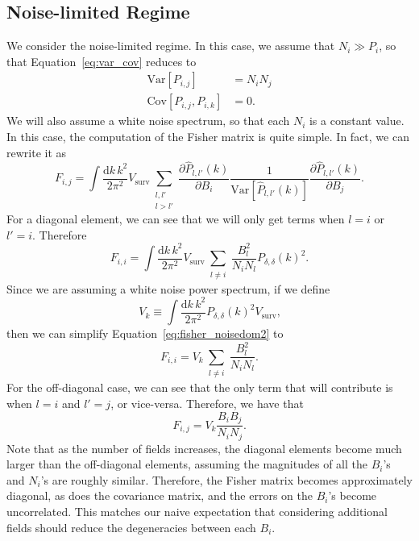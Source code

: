 \documentclass{aastex62}
\newcommand{\beq}{\begin{equation}}
\newcommand{\eeq}{\end{equation}}
\newcommand{\denps}{\ensuremath{P_{\delta,\delta}}}
\newcommand{\xps}[2]{\ensuremath{P_{#1,#2}}}
\newcommand{\Var}[1]{\mathrm{Var}[#1]}
\newcommand{\Cov}[2]{\mathrm{Cov}[#1,#2]}
\begin{document}
\subsection{Noise-limited Regime} \label{ssec:noise_limited}
We consider the noise-limited regime. In this case, we assume that $N_i \gg
P_i$, so that Equation~\ref{eq:var_cov} reduces to
\beq \label{eq:var_cov_noise}
\begin{split}
\Var{\xps{i}{j}} &= N_iN_j \\
\Cov{\xps{i}{j}}{\xps{i}{k}} &= 0 \text{.}
\end{split}
\eeq
We will also assume a white noise spectrum, so that each $N_i$ is a constant
value. In this case, the computation of the Fisher matrix is quite simple. In
fact, we can rewrite it as
\beq\label{eq:fisher_noisedom}
F_{i,j} = 
\int \frac{\text{d}k\,k^2}{2\pi^2} V_{\text{surv}} 
\sum_{\substack{l,l'\\l > l'}}
\frac{\partial \hat{P}_{l,l'}(k)}{\partial B_i}
\frac{1}{\Var{\hat{P}_{l,l'}(k)}}
\frac{\partial \hat{P}_{l,l'}(k)}{\partial B_j}\text{.}
\eeq
For a diagonal element, we can see that we will only get terms when $l=i$ or $l'=i$. Therefore
\beq\label{eq:fisher_noisedom2}
F_{i,i} = 
\int \frac{\text{d}k\,k^2}{2\pi^2} V_{\text{surv}} 
\sum_{\substack{l\neq i}}
\frac{B_l^2}{N_iN_l}\denps(k)^2\text{.}
\eeq
Since we are assuming a white noise power spectrum, if we define
\begin{equation*}
V_k \equiv \int \frac{\text{d}k\,k^2}{2\pi^2} \denps(k)^2 V_{\text{surv}}\text{,}
\end{equation*}
then we can simplify Equation~\ref{eq:fisher_noisedom2} to
\beq\label{eq:fisher_noisedom_diag}
F_{i,i} = 
V_k
\sum_{\substack{l\neq i}}
\frac{B_l^2}{N_iN_l}\text{.}
\eeq
For the off-diagonal case, we can see that the only term that will contribute
is when $l=i$ and $l'=j$, or vice-versa. Therefore, we have that
\beq\label{eq:fisher_noisedom_offdiag}
F_{i,j} = V_k
\frac{B_iB_j}{N_iN_j}\text{.}
\eeq
Note that as the number of fields increases, the diagonal elements become much
larger than the off-diagonal elements, assuming the magnitudes of all the
$B_i$'s and $N_i$'s are roughly similar. Therefore, the Fisher matrix becomes
approximately diagonal, as does the covariance matrix, and the errors on the
$B_i$'s become uncorrelated. This matches our naive expectation that
considering additional fields should reduce the degeneracies between each
$B_i$.
\end{document}
